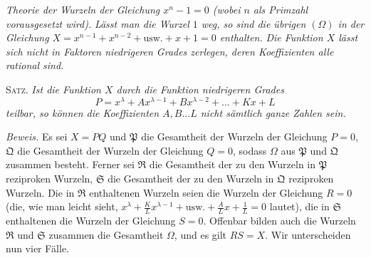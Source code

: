 \begin{center}\textit{Theorie der Wurzeln der Gleichung \(x^n-1=0\) (wobei \(n\) als Primzahl vorausgesetzt wird).} \textit{Lässt man die Wurzel \(1\) weg, so sind die übrigen \((\Omega)\) in der Gleichung \(X=x^{n-1}+x^{n-2}+\mathrm{usw.}+x+1=0\) enthalten.} \textit{Die Funktion \(X\) lässt sich nicht in Faktoren niedrigeren Grades zerlegen, deren Koeffizienten alle rational sind.}\end{center}


\textsc{Satz.} \textit{Ist die Funktion \(X\) durch die Funktion niedrigeren Grades} \[P=x^\lambda+Ax^{\lambda-1}+Bx^{\lambda-2}+\ldots+Kx+L\] \textit{teilbar, so können die Koeffizienten \(A,\allowbreak B\ldots L\) nicht sämtlich ganze Zahlen sein.}

\textit{Beweis.} Es sei \(X=PQ\) und \(\mathfrak P\) die Gesamtheit der Wurzeln der Gleichung \(P=0\), \(\mathfrak Q\) die Gesamtheit der Wurzeln der Gleichung \(Q=0\), sodass \(\Omega\) aus \(\mathfrak P\) und \(\mathfrak Q\) zusammen besteht. Ferner sei \(\mathfrak R\) die Gesamtheit der zu den Wurzeln in \(\mathfrak P\) reziproken Wurzeln, \(\mathfrak S\) die Gesamtheit der zu den Wurzeln in \(\mathfrak Q\) reziproken Wurzeln. Die in \(\mathfrak R\) enthaltenen Wurzeln seien die Wurzeln der Gleichung \(R=0\) (die, wie man leicht sieht, \(x^\lambda+\frac KLx^{\lambda-1}+\mathrm{usw.}+\frac ALx+\frac1L=0\) lautet), die in \(\mathfrak S\) enthaltenen die Wurzeln der Gleichung \(S=0\). Offenbar bilden auch die Wurzeln \(\mathfrak R\) und \(\mathfrak S\) zusammen die Gesamtheit \(\Omega\), und es gilt \(RS=X\). Wir unterscheiden nun vier Fälle.

